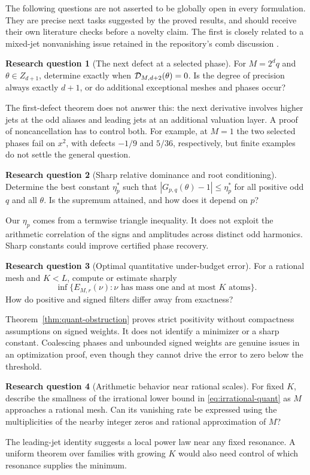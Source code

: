 \documentclass[11pt,a4paper]{article}
\numberwithin{equation}{section}
\theoremstyle{definition}
\newtheorem{question}{Research question}
\theoremstyle{remark}
\begin{document}
The following questions are not asserted to be globally open in every
formulation. They are precise next tasks suggested by the proved results,
and should receive their own literature checks before a novelty claim.
The first is closely related to a mixed-jet nonvanishing issue retained
in the repository's comb discussion \cite{repoComb}.

\begin{question}[The next defect at a selected phase]
For $M=2^dq$ and $\theta\in Z_{d+1}$, determine exactly when
$\mathcal D_{M,d+2}(\theta)=0$. Is the degree of precision always exactly
$d+1$, or do additional exceptional meshes and phases occur?
\end{question}
The first-defect theorem does not answer this: the next derivative
involves higher jets at the odd aliases and leading jets at an additional
valuation layer. A proof of noncancellation has to control both. For
example, at $M=1$ the two selected phases fail on $x^2$, with defects
$-1/9$ and $5/36$, respectively, but finite examples do not settle the
general question.

\begin{question}[Sharp relative dominance and root conditioning]
Determine the best constant $\eta_p^*$ such that
$|G_{p,q}(\theta)-1|\le\eta_p^*$ for all positive odd $q$ and all
$\theta$. Is the supremum attained, and how does it depend on $p$?
\end{question}
Our $\eta_p$ comes from a termwise triangle inequality. It does not exploit
the arithmetic correlation of the signs and amplitudes across distinct
odd harmonics. Sharp constants could improve certified phase recovery.

\begin{question}[Optimal quantitative under-budget error]
For a rational mesh and $K<L$, compute or estimate sharply
\[
 \inf\{E_{M,r}(\nu):\nu\text{ has mass one and at most }K
 \text{ atoms}\}.
\]
How do positive and signed filters differ away from exactness?
\end{question}
Theorem~\ref{thm:quant-obstruction} proves strict positivity without
compactness assumptions on signed weights. It does not identify a
minimizer or a sharp constant. Coalescing phases and unbounded signed
weights are genuine issues in an optimization proof, even though they
cannot drive the error to zero below the threshold.

\begin{question}[Arithmetic behavior near rational scales]
For fixed $K$, describe the smallness of the irrational lower bound
in \eqref{eq:irrational-quant} as $M$ approaches a rational mesh. Can
its vanishing rate be expressed using the multiplicities of the
nearby integer zeros and rational approximation of $M$?
\end{question}
The leading-jet identity suggests a local power law near any fixed
resonance. A uniform theorem over families with growing $K$ would also
need control of which resonance supplies the minimum.
\end{document}
